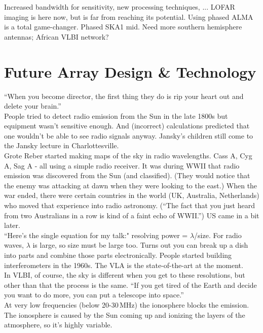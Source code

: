 \documentclass[a4paper]{article}
\begin{document}
Increased bandwidth for sensitivity, new processing techniques, ...
LOFAR imaging is here now, but is far from reaching its potential.
Using phased ALMA is a total game-changer. Phased SKA1 mid. Need more southern hemisphere antennas; African VLBI network? 

\section{Future Array Design \& Technology}

``When you become director, the first thing they do is rip your heart out and delete your brain.'' \\

People tried to detect radio emission from the Sun in the late 1800s but equipment wasn't sensitive enough. And (incorrect) calculations predicted that one wouldn't be able to see radio signals anyway. Jansky's children still come to the Jansky lecture in Charlottesville. \\

Grote Reber started making maps of the sky in radio wavelengths. Cass A, Cyg A, Sag A - all using a simple radio receiver. It was during WWII that radio emission was discovered from the Sun (and classified). (They would notice that the enemy was attacking at dawn when they were looking to the east.) When the war ended, there were certain countries in the world (UK, Australia, Netherlands) who moved that experience into radio astronomy. (``The fact that you just heard from two Australians in a row is kind of a faint echo of WWII.'') US came in a bit later. \\

``Here's the single equation for my talk:" resolving power = $\lambda$/size. For radio waves, $\lambda$ is large, so size must be large too. Turns out you can break up a dish into parts and combine those parts electronically. People started building interferometers in the 1960s. The VLA is the state-of-the-art at the moment. \\

In VLBI, of course, the sky is different when you get to these resolutions, but other than that the process is the same. ``If you get tired of the Earth and decide you want to do more, you can put a telescope into space.'' \\

At very low frequencies (below 20-30\,MHz) the ionosphere blocks the emission. The ionosphere is caused by the Sun coming up and ionizing the layers of the atmosphere, so it's highly variable. \\
\end{document}

